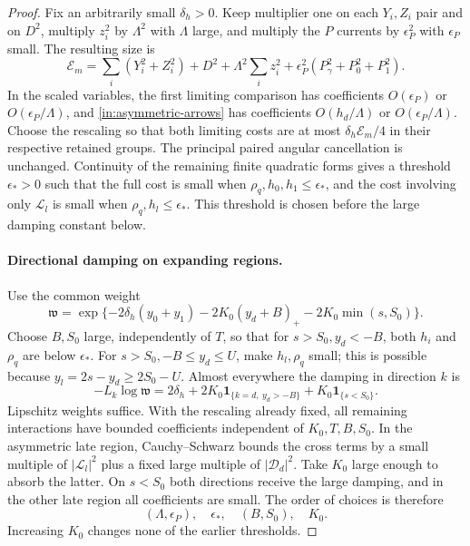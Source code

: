 \begin{proof}
Fix an arbitrarily small $\delta_h>0$. Keep multiplier one on each
$Y_i,Z_i$ pair and on $D^2$, multiply $z_i^2$ by $\Lambda^2$
with $\Lambda$ large, and multiply the $P$ currents by
$\epsilon_P^2$ with $\epsilon_P$ small. The resulting size is
\begin{equation}\label{in:rescaled-energy}
 \mathcal E_m=\sum_i(Y_i^2+Z_i^2)+D^2
       +\Lambda^2\sum_i z_i^2
       +\epsilon_P^2(P_\gamma^2+P_0^2+P_1^2).
\end{equation}
In the scaled variables, the first limiting comparison has coefficients
$O(\epsilon_P)$ or $O(\epsilon_P/\Lambda)$, and
\eqref{in:asymmetric-arrows} has coefficients
$O(h_d/\Lambda)$ or $O(\epsilon_P/\Lambda)$.
Choose the rescaling so that both limiting costs are at most
$\delta_h\mathcal E_m/4$ in their respective retained groups.
The principal paired angular cancellation is unchanged.
Continuity of the remaining finite quadratic forms gives a threshold
$\epsilon_*>0$ such that the full cost is small when
$\rho_q,h_0,h_1\le\epsilon_*$, and the cost involving only
$\mathcal L_l$ is small when $\rho_q,h_l\le\epsilon_*$.
This threshold is chosen before the large damping constant below.

\paragraph{Directional damping on expanding regions.}
Use the common weight
\begin{equation}\label{in:high-weight}
 \mathfrak w=\exp\{-2\delta_h(y_0+y_1)
       -2K_0(y_d+B)_+-2K_0\min(s,S_0)\}.
\end{equation}
Choose $B,S_0$ large, independently of $T$, so that for
$s>S_0,y_d<-B$, both $h_i$ and $\rho_q$ are below
$\epsilon_*$. For $s>S_0,-B\le y_d\le U$, make
$h_l,\rho_q$ small; this is possible because
$y_l=2s-y_d\ge2S_0-U$. Almost everywhere the damping in direction
$k$ is
\[
 -L_k\log\mathfrak w
 =2\delta_h+2K_0\mathbf1_{\{k=d,\ y_d>-B\}}
                         +K_0\mathbf1_{\{s<S_0\}}.
\]
Lipschitz weights suffice. With the rescaling already fixed, all
remaining interactions have bounded coefficients independent of
$K_0,T,B,S_0$. In the asymmetric late region, Cauchy--Schwarz bounds
the cross terms by a small multiple of $|\mathcal L_l|^2$ plus a
fixed large multiple of $|\mathcal D_d|^2$. Take $K_0$ large enough
to absorb the latter. On $s<S_0$ both directions receive the large
damping, and in the other late region all coefficients are small.
The order of choices is therefore
\[
 (\Lambda,\epsilon_P),\quad\epsilon_*,\quad(B,S_0),\quad K_0.
\]
Increasing $K_0$ changes none of the earlier thresholds.


\end{proof}
